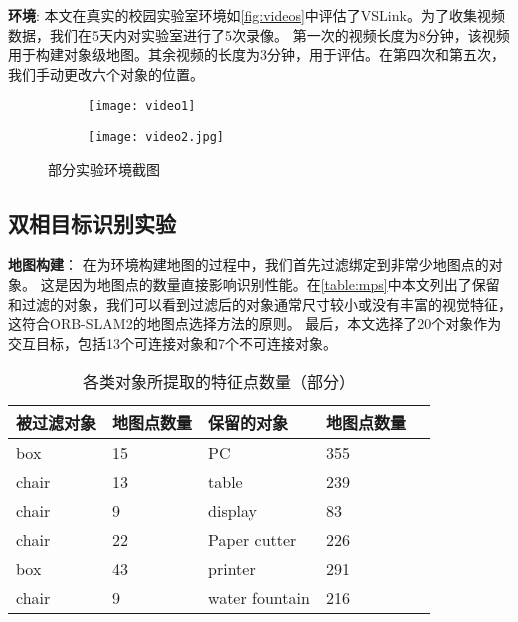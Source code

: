 \textbf{环境}: 本文在真实的校园实验室环境如\autoref{fig:videos}中评估了VSLink。为了收集视频数据，我们在5天内对实验室进行了5次录像。
第一次的视频长度为8分钟，该视频用于构建对象级地图。其余视频的长度为3分钟，用于评估。在第四次和第五次，我们手动更改六个对象的位置。

\begin{figure}[htbp]
	\centering
	\begin{subfigure}{.49\linewidth}
		\texttt{[image: video1]}
		\caption{}
	\end{subfigure}
	\begin{subfigure}{.49\linewidth}
		\texttt{[image: video2.jpg]}
		\caption{}
	\end{subfigure}
	\caption{部分实验环境截图}\label{fig:videos}
\end{figure}

\subsection{双相目标识别实验}

\textbf{地图构建}：
在为环境构建地图的过程中，我们首先过滤绑定到非常少地图点的对象。
这是因为地图点的数量直接影响识别性能。在\autoref{table:mps}中本文列出了保留和过滤的对象，我们可以看到过滤后的对象通常尺寸较小或没有丰富的视觉特征，这符合ORB-SLAM2\cite{mur2017orb}的地图点选择方法的原则。
最后，本文选择了20个对象作为交互目标，包括13个可连接对象和7个不可连接对象。

\begin{table}[htbp]
	\caption{各类对象所提取的特征点数量（部分）}  \label{table:mps} 
	\begin{center}  
		\begin{tabular}{|l|l|l|l| p{4cm}|}  
			\hline  
			\textbf{被过滤对象} & \textbf{地图点数量} & \textbf{保留的对象} & \textbf{地图点数量}\\ \hline  
			box & 15 & PC & 355  \\ \hline 
			chair & 13 & table & 239  \\ \hline 
			chair & 9 & display & 83  \\ \hline  
			chair & 22 & Paper cutter & 226  \\ \hline  
			box & 43 & printer & 291  \\ \hline  
			chair & 9 & water fountain & 216  \\ \hline  
		\end{tabular}  
	\end{center}  
\end{table} 

